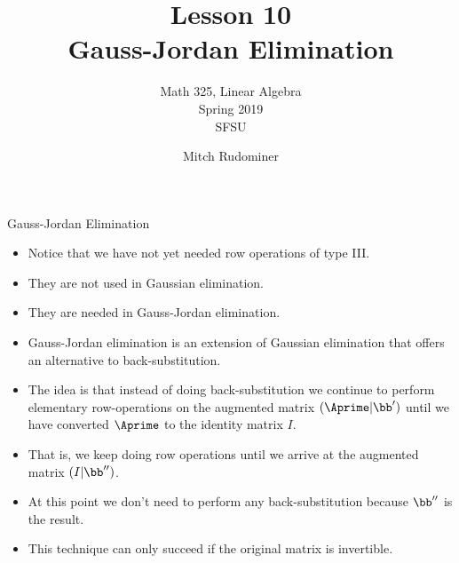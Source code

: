 \documentclass{beamer}
\title{Lesson 10\\ Gauss-Jordan Elimination}
\subtitle{Math 325, Linear Algebra \\ Spring 2019 \\ SFSU}
\author{Mitch Rudominer}
\date{}
\begin{document}
\begin{frame}
  \titlepage
\end{frame}


\begin{frame}{Gauss-Jordan Elimination}

\begin{itemize}
\item Notice that we have not yet needed row operations of type III.
\item They are not used in Gaussian elimination.
\item They are needed in Gauss-Jordan elimination.
\item Gauss-Jordan elimination is an extension of Gaussian elimination that
offers an alternative to back-substitution.
\item The idea is that instead of doing back-substitution we continue to
perform elementary row-operations on the augmented matrix $(\Aprime \vert \bb^{\prime})$
until we have converted $\Aprime$ to the identity matrix $I$.
\item That is, we keep doing row operations until we arrive at the augmented
matrix $(I \vert \bb^{\prime\prime})$.
\item At this point we don't need to perform any back-substitution because $\bb^{\prime\prime}$
is the result.
\item This technique can only succeed if the original matrix is invertible.
\end{itemize}

\end{frame}

\end{document}
